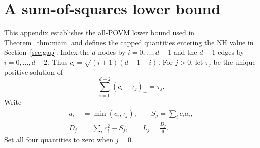 \documentclass[aps,pra,reprint,superscriptaddress,longbibliography]{revtex4-2}
\theoremstyle{remark}
\begin{document}
\section{A sum-of-squares lower bound}\label{sec:lower}
This appendix establishes the all-POVM lower bound used in
Theorem~\ref{thm:main} and defines the capped quantities entering
the NH value in Section~\ref{sec:gap}.
Index the $d$ nodes by $i=0,\ldots,d-1$ and the
$d-1$ edges by $i=0,\ldots,d-2$. Thus
$c_i=\sqrt{(i+1)(d-1-i)}$. For $j>0$, let $\tau_j$ be the unique
positive solution of
\begin{equation}
 \sum_{i=0}^{d-2}(c_i-\tau_j)_+=\tau_j.
 \label{eq:cap}
\end{equation}
Write
\begin{equation}
\begin{aligned}
a_i&=\min(c_i,\tau_j),\qquad S_j=\sum_i c_i a_i,\\
D_j&=\sum_i c_i^2-S_j,\qquad L_j=\frac{D_j}{d}.
\end{aligned}
\label{eq:cap-quantities}
\end{equation}
Set all four quantities to zero when $j=0$.
\end{document}

